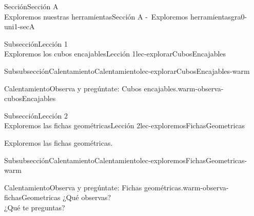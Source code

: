 \begin{sectionptx}{Sección}{{\Large Sección A\\}Exploremos nuestras herramientas}{}{Sección A -~Exploremos herramientas}{}{}{gra0-uni1-secA}
\begin{subsectionptx}{Subsección}{{\normalsize Lección 1\\[-0.05cm]}Exploremos los cubos encajables}{}{Lección 1}{}{}{lec-explorarCubosEncajables}
\begin{subsubsectionptx}{Subsubsección}{Calentamiento}{}{Calentamiento}{}{}{lec-explorarCubosEncajables-warm}
\begin{exploration}{Calentamiento}{Observa y pregúntate: Cubos encajables.}{warm-observa-cubosEncajables}
\begin{image}{0}{1}{0}{}
\end{image}%
\end{exploration}%
\end{subsubsectionptx}
%
%
\typeout{************************************************}
\typeout{************************************************}
%
\end{subsectionptx}
%
%
\typeout{************************************************}
\typeout{************************************************}
%
\begin{subsectionptx}{Subsección}{{\normalsize Lección 2\\[-0.05cm]}Exploremos las fichas geométricas}{}{Lección 2}{}{}{lec-exploremosFichasGeometricas}
\begin{introduction}{}%
Exploremos las fichas geométricas.%
\end{introduction}%
%
%
\typeout{************************************************}
\typeout{************************************************}
%
\begin{subsubsectionptx}{Subsubsección}{Calentamiento}{}{Calentamiento}{}{}{lec-exploremosFichasGeometricas-warm}
\begin{exploration}{Calentamiento}{Observa y pregúntate: Fichas geométricas.}{warm-observa-fichasGeometricas}%
¿Qué observas?\\
 ¿Qué te preguntas?%
\begin{image}{0}{1}{0}{}%

\end{image}
\end{exploration}
\end{subsubsectionptx}
\end{subsectionptx}
\end{sectionptx}

